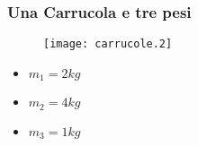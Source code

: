 \begin{minipage}{\textwidth}

\subsubsection{Una Carrucola e tre pesi}

\begin{figure}[H]
\centering
\texttt{[image: carrucole.2]}
\end{figure}

\begin{itemize}
\item $m_1=2 kg$
\item $m_2=4 kg$
\item $m_3=1 kg$
\end{itemize}

\end{minipage}

